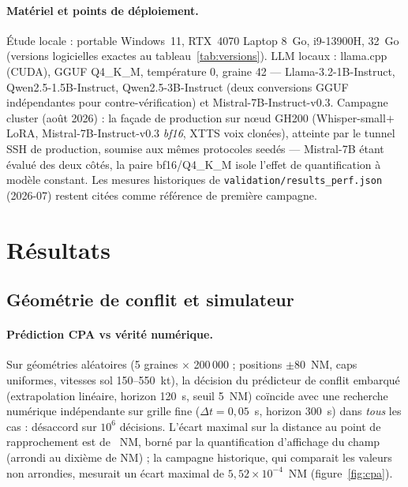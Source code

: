 \documentclass[10pt,a4paper]{article}
\newcommand{\syst}[1]{\texttt{#1}}
\begin{document}
\paragraph{Matériel et points de déploiement.} Étude locale : portable
Windows~11, RTX~4070 Laptop 8~Go, i9-13900H, 32~Go (versions logicielles
exactes au tableau~\ref{tab:versions}). LLM locaux : llama.cpp (CUDA),
GGUF Q4\_K\_M, température 0, graine 42 --- Llama-3.2-1B-Instruct,
Qwen2.5-1.5B-Instruct, Qwen2.5-3B-Instruct (deux conversions GGUF
indépendantes pour contre-vérification) et Mistral-7B-Instruct-v0.3.
Campagne cluster (août 2026) : la façade de production sur nœud GH200
(Whisper-small$+$LoRA, Mistral-7B-Instruct-v0.3 \emph{bf16}, XTTS voix
clonées), atteinte par le tunnel SSH de production, soumise aux mêmes
protocoles seedés --- Mistral-7B étant évalué des deux côtés, la paire
bf16/Q4\_K\_M isole l'effet de quantification à modèle constant. Les
mesures historiques de \syst{validation/results\_perf.json} (2026-07)
restent citées comme référence de première campagne.

\section{Résultats}
\label{sec:resultats}

\subsection{Géométrie de conflit et simulateur}
\label{sec:res-geo}

\paragraph{Prédiction CPA vs vérité numérique.} Sur \nCPAGeoms{} géométries
aléatoires (5 graines $\times$ 200\,000 ; positions $\pm$80~NM, caps
uniformes, vitesses sol 150--550~kt), la décision du prédicteur de conflit
embarqué (extrapolation linéaire, horizon 120~s, seuil 5~NM) coïncide avec
une recherche numérique indépendante sur grille fine ($\Delta t=0{,}05$~s,
horizon 300~s) dans \emph{tous} les cas : \nCPADesaccords{} désaccord sur
$10^6$ décisions. L'écart maximal sur la distance au point de rapprochement
est de \nCPAErrMax~NM, borné par la quantification d'affichage du champ
(arrondi au dixième de NM) ; la campagne historique, qui comparait les valeurs non arrondies, mesurait un écart maximal de
$5{,}52\times10^{-4}$~NM (figure~\ref{fig:cpa}).
\end{document}
